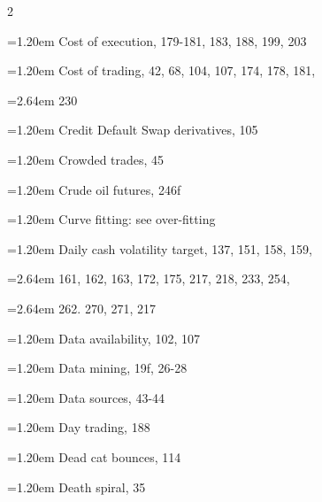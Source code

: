 {\begin{multicols}{2}
\par \noindent\hangindent=1.20em\hspace*{0.00em} Cost of execution, 179-181, 183, 188, 199, 203
\par \noindent\hangindent=1.20em\hspace*{0.00em} Cost of trading, 42, 68, 104, 107, 174, 178, 181,
\par \noindent\hangindent=2.64em\hspace*{1.44em} 230
\par \noindent\hangindent=1.20em\hspace*{0.00em} Credit Default Swap derivatives, 105
\par \noindent\hangindent=1.20em\hspace*{0.00em} Crowded trades, 45
\par \noindent\hangindent=1.20em\hspace*{0.00em} Crude oil futures, 246f
\par \noindent\hangindent=1.20em\hspace*{0.00em} Curve fitting: see over-fitting
\par \noindent\hangindent=1.20em\hspace*{0.00em} Daily cash volatility target, 137, 151, 158, 159,
\par \noindent\hangindent=2.64em\hspace*{1.44em} 161, 162, 163, 172, 175, 217, 218, 233, 254,
\par \noindent\hangindent=2.64em\hspace*{1.44em} 262. 270, 271, 217
\par \noindent\hangindent=1.20em\hspace*{0.00em} Data availability, 102, 107
\par \noindent\hangindent=1.20em\hspace*{0.00em} Data mining, 19f, 26-28
\par \noindent\hangindent=1.20em\hspace*{0.00em} Data sources, 43-44
\par \noindent\hangindent=1.20em\hspace*{0.00em} Day trading, 188
\par \noindent\hangindent=1.20em\hspace*{0.00em} Dead cat bounces, 114
\par \noindent\hangindent=1.20em\hspace*{0.00em} Death spiral, 35

\end{multicols}}
